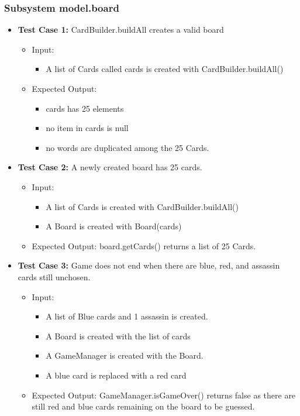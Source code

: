 \documentclass[12pt]{article}
\begin{document}
\subsubsection{Subsystem model.board}
\begin{itemize}
    \item \textbf{Test Case 1:} CardBuilder.buildAll creates a valid board
        \begin{itemize}
        \item Input:
            \begin{itemize}
                \item A list of Cards called cards is created with CardBuilder.buildAll()
            \end{itemize}
        \item Expected Output:
            \begin{itemize}
                \item cards has 25 elements
                \item no item in cards is null
                \item no words are duplicated among the 25 Cards.
            \end{itemize}
    \end{itemize}
    
    \item \textbf{Test Case 2:} A newly created board has 25 cards.
        \begin{itemize}
        \item Input:
            \begin{itemize}
                \item A list of Cards is created with CardBuilder.buildAll()
                \item A Board is created with Board(cards)
            \end{itemize}
        \item Expected Output: board.getCards() returns a list of 25 Cards.
    \end{itemize}
    
    \item \textbf{Test Case 3:} Game does not end when there are blue, red, and assassin cards still unchosen.
        \begin{itemize}
        \item Input:
            \begin{itemize}
                \item A list of Blue cards and 1 assassin is created.
                \item A Board is created with the list of cards
                \item A GameManager is created with the Board.
                \item A blue card is replaced with a red card
            \end{itemize}
        \item Expected Output: GameManager.isGameOver() returns false as there are still red and blue cards remaining on the board to be guessed.
    \end{itemize}
    

\end{itemize}
\end{document}
